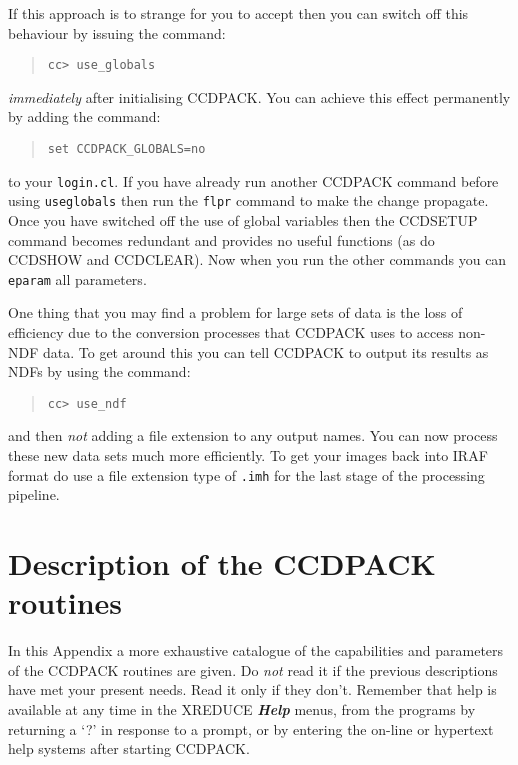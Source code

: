 \documentclass[twoside,11pt]{article}
\newcommand{\htmlref}[2]{#1}
\renewcommand{\_}{\texttt{\symbol{95}}}
\newcommand{\menu}[1]{{\small \bf \em #1}}
\newcommand{\text}[1]{{\small \tt #1}}
\newcommand{\routine}[1]{{\sc #1}}
\newcommand{\xroutine}[1]{\htmlref{{\sc #1}}{#1}}
\begin{document}
If this approach is to strange for you to accept then you can switch
off this behaviour by issuing the command:
\begin{quote}
\begin{verbatim}
cc> use_globals
\end{verbatim}
\end{quote}
{\em{immediately}} after initialising CCDPACK. You can achieve this effect
permanently by adding the command:
\begin{quote}
\begin{verbatim}
set CCDPACK_GLOBALS=no
\end{verbatim}
\end{quote}
to your \text{login.cl}. If you have already run another CCDPACK
command before using \text{use\_globals} then run the \text{flpr}
command to make the change propagate. Once you have switched off the
use of global variables then the \routine{CCDSETUP} command becomes
redundant and provides no useful functions (as do \routine{CCDSHOW}
and \routine{CCDCLEAR}). Now when you run the other
commands you can \text{eparam} all parameters.

One thing that you may find a problem for large sets of data is the
loss of efficiency due to the conversion processes that CCDPACK uses
to access non-NDF data. To get around this you can tell CCDPACK to
output its results as NDFs by using the command:
\begin{quote}
\begin{verbatim}
cc> use_ndf
\end{verbatim}
\end{quote}
and then {\em{not}} adding a file extension to any output names. You can
now process these new data sets much more efficiently. To get your
images back into IRAF format do use a file extension type of
\text{.imh} for the last stage of the processing pipeline.

\section{Description of the CCDPACK routines \label{app:description}}

In this Appendix a more exhaustive catalogue of the capabilities and parameters
of the CCDPACK routines are given. Do {\em{not}} read it if the previous
descriptions have met your present needs. Read it only if they don't. Remember
that help is available at any time in the \xroutine{XREDUCE}
\menu{Help} menus, from the programs by returning a `?' in response to a prompt,
or by entering the on-line or hypertext help systems after starting CCDPACK.
\end{document}
